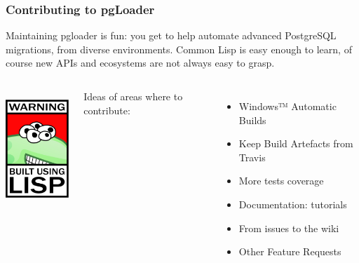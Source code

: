 \documentclass{beamer}
\begin{document}
\begin{frame}[fragile]
  \frametitle{Contributing to pgLoader}

  Maintaining pgloader is fun: you get to help automate advanced PostgreSQL
  migrations, from diverse environments. Common Lisp is easy enough to
  learn, of course new APIs and ecosystems are not always easy to grasp.
  
  \begin{columns}[c]
    \begin{center}
      \includegraphics[height=12em]{lisplogo_warning2_256.png}
    \end{center}

    Ideas of areas where to contribute:
      \begin{itemize}
      \item Windows™ Automatic Builds
      \item Keep Build Artefacts from Travis
      \item More tests coverage
      \item Documentation: tutorials
      \item From issues to the wiki
      \item Other Feature Requests
    \end{itemize}
  \end{columns}  
\end{frame}
\end{document}
